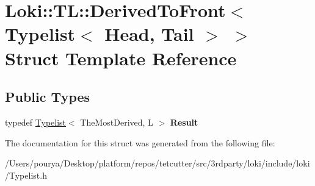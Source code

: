 \hypertarget{structLoki_1_1TL_1_1DerivedToFront_3_01Typelist_3_01Head_00_01Tail_01_4_01_4}{}\section{Loki\+:\+:T\+L\+:\+:Derived\+To\+Front$<$ Typelist$<$ Head, Tail $>$ $>$ Struct Template Reference}
\label{structLoki_1_1TL_1_1DerivedToFront_3_01Typelist_3_01Head_00_01Tail_01_4_01_4}
\subsection*{Public Types}
\begin{DoxyCompactItemize}
\item 
\hypertarget{structLoki_1_1TL_1_1DerivedToFront_3_01Typelist_3_01Head_00_01Tail_01_4_01_4_acdb03d599487ea688425bed5052edf8a}{}typedef \hyperlink{structLoki_1_1Typelist}{Typelist}$<$ The\+Most\+Derived, L $>$ {\bfseries Result}\label{structLoki_1_1TL_1_1DerivedToFront_3_01Typelist_3_01Head_00_01Tail_01_4_01_4_acdb03d599487ea688425bed5052edf8a}

\end{DoxyCompactItemize}


The documentation for this struct was generated from the following file\+:\begin{DoxyCompactItemize}
\item 
/\+Users/pourya/\+Desktop/platform/repos/tetcutter/src/3rdparty/loki/include/loki/Typelist.\+h\end{DoxyCompactItemize}
